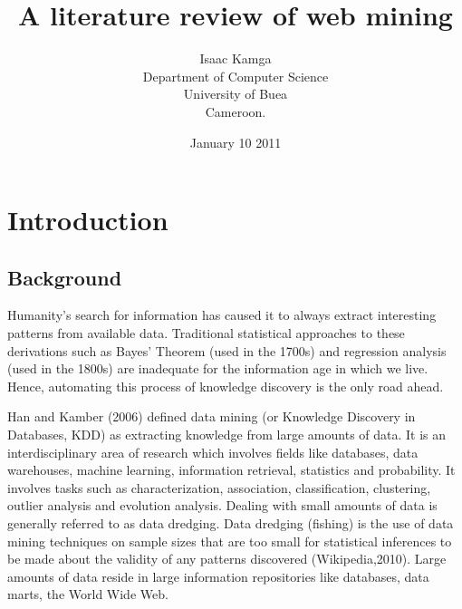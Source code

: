 \documentclass{article}
\title{A literature review of web mining}
\author{Isaac Kamga\\
Department of Computer Science\\
University of Buea\\
Cameroon.\\ }
\date{January 10 2011}
\begin{document}
\maketitle
{}

\pagebreak
\tableofcontents{}

\pagebreak
\section{Introduction}
\subsection{Background}

Humanity’s search for information has caused it to always extract interesting patterns from available data. Traditional statistical approaches to these derivations such as Bayes’ Theorem (used in the 1700s) and regression analysis (used in the 1800s) are inadequate for the information age in which we live. Hence, automating this process of knowledge discovery is the only road ahead.

Han and Kamber (2006) defined data mining (or Knowledge Discovery in Databases, KDD) as extracting knowledge from large amounts of data. It is an interdisciplinary area of research which involves fields like databases, data warehouses, machine learning, information retrieval, statistics and probability. It involves tasks such as characterization, association, classification, clustering, outlier analysis and evolution analysis. Dealing with small amounts of data is generally referred to as data dredging. Data dredging (fishing) is the use of data mining techniques on sample sizes that are too small for statistical inferences to be made about the validity of any patterns discovered (Wikipedia,2010). Large amounts of data reside in large information repositories like databases, data marts, the World Wide Web.
\end{document}
